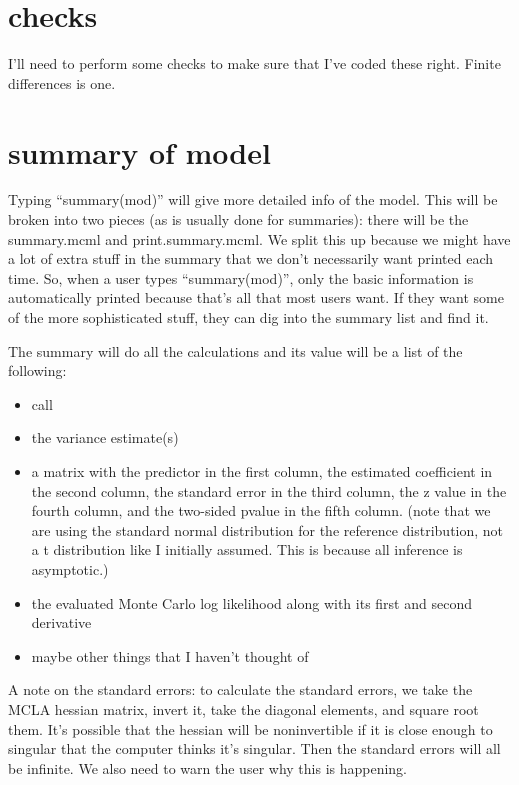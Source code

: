 \documentclass{article}
\begin{document}
\section{checks}
I'll need to perform some checks to make sure that I've coded these right. Finite differences is one.


\section{summary of model}
Typing ``summary(mod)'' will give more detailed info of the model. This will be broken into two pieces (as is usually done for summaries): there will be the summary.mcml and print.summary.mcml. We split this up because we might have a lot of extra stuff in the summary that we don't necessarily want printed each time. So, when a user types ``summary(mod)'', only the  basic information is automatically printed because that's all that most users want. If they want some of the more sophisticated stuff, they can dig into the summary list and find it.

The summary will do all the calculations and its value will be a list of the following:
\begin{itemize}
\item call
\item the variance estimate(s)
\item a matrix with the predictor in the first column, the estimated coefficient in the second column, the standard error in the third column, the z value in the fourth column, and the two-sided pvalue  in the fifth column. (note that we are using the standard normal distribution for the reference distribution, not a t distribution like I initially assumed. This is because all inference is asymptotic.)
\item the evaluated Monte Carlo log likelihood along with its first and second derivative
\item maybe other things that I haven't thought of
\end{itemize}

A note on the standard errors: to calculate the standard errors, we take the MCLA hessian matrix, invert it, take the diagonal elements, and square root them. It's possible that the hessian will be noninvertible if it is close enough to singular that the computer thinks it's singular.  Then the standard errors will all be infinite. We also need to warn the user why this is happening.
\end{document}

